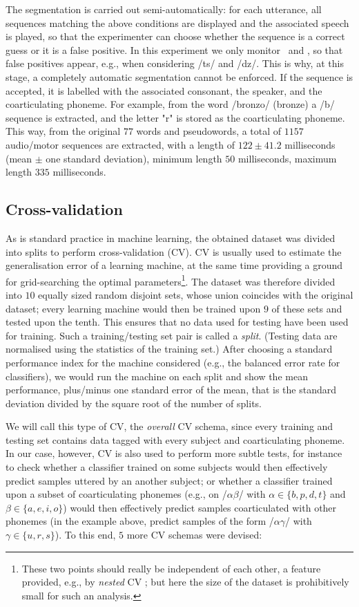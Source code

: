 The segmentation is carried out semi-automatically: for each
utterance, all sequences matching the above conditions are displayed and the
associated speech is played, so that the experimenter can choose whether the
sequence is a correct guess or it is a false positive. In this experiment we only
monitor \lio\ and \ttu, so that false positives appear, e.g., when considering
/ts/ and /dz/. This is why, at this stage, a completely automatic segmentation
cannot be enforced. If the sequence is accepted, it is labelled
with the associated consonant, the speaker, and the
coarticulating phoneme. For example, from the word /bronzo/ (bronze) a /b/
sequence is extracted, and the letter "r" is stored as the coarticulating phoneme.
This way, from the original $77$ words and pseudowords, a total
of $1157$ audio/motor sequences are extracted, with a length of $122 \pm 41.2$
milliseconds (mean $\pm$ one standard deviation), minimum length $50$ milliseconds,
maximum length $335$ milliseconds.

\subsection{Cross-validation}
\label{subsec:cv}

As is standard practice in machine learning, the obtained dataset was divided into
splits to perform cross-validation (CV). CV \cite{stat} is usually used
to estimate the generalisation error of a learning machine, at the
same time providing a ground for grid-searching the optimal parameters\footnote{These
two points should really be independent of each other, a feature provided, e.g., by
\emph{nested} CV \cite{nestedCV}; but here the size of the dataset is
prohibitively small for such an analysis.}. The dataset was therefore divided into
$10$ equally sized random disjoint sets, whose union coincides with the original dataset; every
learning machine would then be trained upon $9$ of these sets and tested upon the
tenth. This ensures that no data used for testing have been used for training. Such a
training/testing set pair is called a \emph{split}. (Testing data are normalised using the
statistics of the training set.) After choosing a standard performance index for the machine
considered (e.g., the balanced error rate for classifiers), we would run the machine
on each split and show the mean performance, plus/minus one standard error of the mean,
that is the standard deviation divided by the square root of the number of splits.

We will call this type of CV, the \emph{overall} CV schema,
since every training and testing set contains data tagged with every subject and
coarticulating phoneme. In our case, however, CV is also used to perform more subtle
tests, for instance to check whether a classifier trained on some subjects would
then effectively predict samples uttered by an another subject; or whether a classifier
trained upon a subset of coarticulating phonemes (e.g., on /$\alpha\beta$/ with
$\alpha \in \{b,p,d,t\}$ and $\beta \in \{a,e,i,o\}$) would then effectively predict samples
coarticulated with other phonemes (in the example above, predict samples of the form
/$\alpha\gamma$/ with $\gamma \in \{u,r,s\}$). To this end, $5$ more CV schemas were devised:

